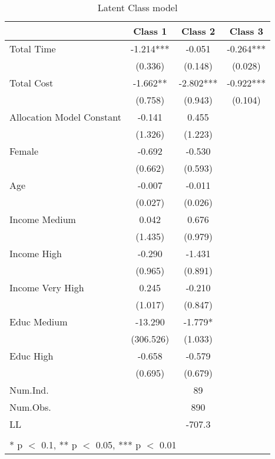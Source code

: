 \begin{table}[!h]

\caption{\label{tab:}Latent Class model}
\centering
\begin{tabular}[t]{lccc}
\toprule
  & Class 1 & Class 2 & Class 3\\
\midrule
Total Time & -1.214*** & -0.051 & -0.264***\\
 & (0.336) & (0.148) & (0.028)\\
Total Cost & -1.662** & -2.802*** & -0.922***\\
 & (0.758) & (0.943) & (0.104)\\
Allocation Model Constant & -0.141 & 0.455 & \\
 & (1.326) & (1.223) & \\
Female & -0.692 & -0.530 & \\
 & (0.662) & (0.593) & \\
Age & -0.007 & -0.011 & \\
 & (0.027) & (0.026) & \\
Income Medium & 0.042 & 0.676 & \\
 & (1.435) & (0.979) & \\
Income High & -0.290 & -1.431 & \\
 & (0.965) & (0.891) & \\
Income Very High & 0.245 & -0.210 & \\
 & (1.017) & (0.847) & \\
Educ Medium & -13.290 & -1.779* & \\
 & (306.526) & (1.033) & \\
Educ High & -0.658 & -0.579 & \\
 & (0.695) & (0.679) & \\
\midrule
Num.Ind. &  & 89 & \\
Num.Obs. &  & 890 & \\
LL &  & -707.3 & \\
 &  &  & \\
\bottomrule
\multicolumn{4}{l}{\textsuperscript{} * p $<$ 0.1, ** p $<$ 0.05, *** p $<$ 0.01}\\
\end{tabular}
\end{table}
